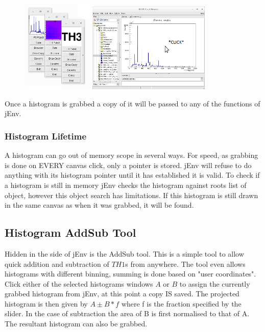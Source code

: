 \documentclass[a4paper,10pt]{article}
\begin{document}
\begin{figure}[!h]
\centering
\includegraphics[width=0.3\textwidth]{jEnvB.png}
\includegraphics[width=0.52\textwidth]{jEnvD.png}     
\end{figure}

Once a histogram is grabbed a copy of it will be passed to any of the functions of jEnv.

\subsubsection{Histogram Lifetime}
A histogram can go out of memory scope in several ways. For speed, as grabbing is done on EVERY canvas click, only a pointer is stored. jEnv will refuse to do anything with its histogram pointer until it has established it is valid. To check if a histogram is still in memory jEnv checks the histogram against roots list of object, however this object search has limitations. If this histogram is still drawn in the same canvas as when it was grabbed, it will be found.

\subsection{Histogram AddSub Tool}
Hidden in the side of jEnv is the AddSub tool. This is a simple tool to allow quick addition and subtraction of $TH1$s from anywhere. The tool even allows histograms with different binning, summing is done based on "user coordinates".
Click either of the selected histograms windows $A$ or $B$ to assign the currently grabbed histogram from jEnv, at this point a copy IS saved. The projected histogram is then given by $A\pm B*f$ where f is the fraction specified by the slider. In the case of subtraction the area of B is first normalised to that of A. The resultant histogram can also be grabbed.
\end{document}
